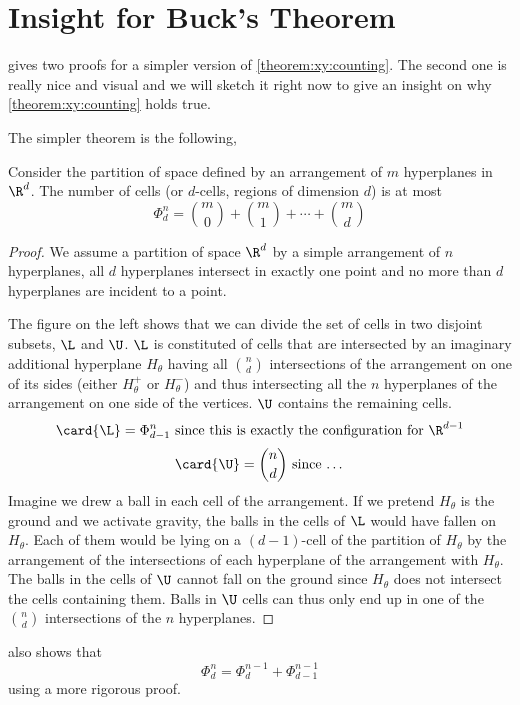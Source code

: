 \section{Insight for Buck's Theorem}

\citet*{matousek:2002} gives two proofs for a simpler version of
\ref{theorem:xy:counting}. The second one is really nice and visual and we will
sketch it right now to give an insight on why \ref{theorem:xy:counting} holds
true.

The simpler theorem is the following,

\begin{theorem}
Consider the partition of space defined by an arrangement of \(m\) hyperplanes
in \(\R^d\). The number of cells (or \(d\)-cells, regions of dimension \(d\))
is at most
\begin{displaymath}
\Phi_d^n = \binom{m}{0} + \binom{m}{1} + \cdots + \binom{m}{d}
\end{displaymath}
\end{theorem}

\begin{proof}
We assume a partition of space \(\R^d\) by a simple arrangement of \(n\)
hyperplanes, \ie all \(d\) hyperplanes intersect in exactly one point and no
more than \(d\) hyperplanes are incident to a point.

The figure on the left shows that we can divide the set of cells in two
disjoint subsets, \(\L\) and \(\U\). \(\L\) is constituted of cells that are
intersected by an imaginary additional hyperplane \(H_{\theta}\) having all
\(\binom{n}{d}\) intersections of the arrangement on one of its sides (either
\(H_{\theta}^{+}\) or \(H_{\theta}^{-}\)) and thus intersecting all the \(n\)
hyperplanes of the arrangement on one side of the vertices. \(\U\) contains the
remaining cells.
\begin{displaymath}
\card{\L} = \Phi_{d-1}^n \text{ since this is exactly the configuration for } \R^{d-1}
\end{displaymath}
\begin{displaymath}
\card{\U} = \binom{n}{d} \text{ since \dots}
\end{displaymath}
Imagine we drew a ball in each cell of the arrangement. If we pretend
\(H_{\theta}\) is the ground and we activate gravity, the balls in the cells of
\(\L\) would have fallen on \(H_{\theta}\). Each of them would be lying on a
\((d-1)\)-cell of the partition of \(H_{\theta}\) by the arrangement of the
intersections of each hyperplane of the arrangement with \(H_{\theta}\). The
balls in the cells of \(\U\) cannot fall on the ground since \(H_{\theta}\)
does not intersect the cells containing them. Balls in \(\U\) cells can thus
only end up in one of the \(\binom{n}{d}\) intersections of the \(n\)
hyperplanes.
\end{proof}

\citet*{matousek:2002} also shows that
\begin{displaymath}
\Phi_d^n = \Phi_d^{n-1} + \Phi_{d-1}^{n-1}
\end{displaymath}
using a more rigorous proof.
